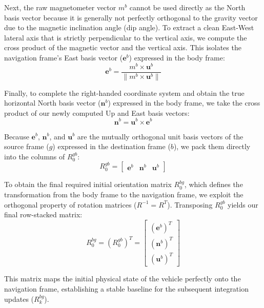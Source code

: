 \documentclass{article}
\begin{document}
\noindent Next, the raw magnetometer vector $m^b$ cannot be used directly as the North basis vector because it is generally not perfectly orthogonal to the gravity vector due to the magnetic inclination angle (dip angle). To extract a clean East-West lateral axis that is strictly perpendicular to the vertical axis, we compute the cross product of the magnetic vector and the vertical axis. This isolates the navigation frame's East basis vector ($\mathbf{e}^b$) expressed in the body frame:
\[
\mathbf{e}^b = \frac{m^b \times \mathbf{u}^b}{\|m^b \times \mathbf{u}^b\|}
\]

\noindent Finally, to complete the right-handed coordinate system and obtain the true horizontal North basis vector ($\mathbf{n}^b$) expressed in the body frame, we take the cross product of our newly computed Up and East basis vectors:
\[
\mathbf{n}^b = \mathbf{u}^b \times \mathbf{e}^b
\]

\noindent Because $\mathbf{e}^b$, $\mathbf{n}^b$, and $\mathbf{u}^b$ are the mutually orthogonal unit basis vectors of the source frame ($g$) expressed in the destination frame ($b$), we pack them directly into the columns of $R_0^{gb}$:
\[
R_0^{gb} = 
\begin{bmatrix}
	\mathbf{e}^b & \mathbf{n}^b & \mathbf{u}^b
\end{bmatrix}
\]

\noindent To obtain the final required initial orientation matrix $R_0^{bg}$, which defines the transformation from the body frame to the navigation frame, we exploit the orthogonal property of rotation matrices ($R^{-1} = R^T$). Transposing $R_0^{gb}$ yields our final row-stacked matrix:
\[
R_0^{bg} = (R_0^{gb})^T = 
\begin{bmatrix}
	(\mathbf{e}^b)^T \\
	(\mathbf{n}^b)^T \\
	(\mathbf{u}^b)^T
\end{bmatrix}
\]

\noindent This matrix maps the initial physical state of the vehicle perfectly onto the navigation frame, establishing a stable baseline for the subsequent integration updates ($R_k^{bg}$).
\end{document}
